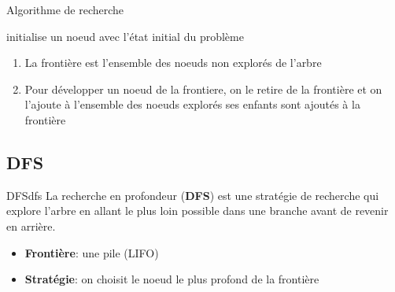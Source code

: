 \documentclass[a4paper, 12pt]{extarticle}
\begin{document}
\begin{algorithm}[H]
    \caption{Algorithme de recherche}\label{alg:stsearch}
    \begin{algorithmic}
        \State initialise un noeud avec l'état initial du problème

        \EndLoop
        \EndFunction
    \end{algorithmic}
\end{algorithm}

\begin{remarks}\leavevmode
\begin{enumerate}
    \item La frontière est l'ensemble des noeuds non explorés de l'arbre
    \item Pour développer un noeud de la frontiere, on le retire de la frontière et on l'ajoute à l'ensemble des noeuds explorés
        ses enfants sont ajoutés à la frontière
\end{enumerate}
\end{remarks}




\subsection{DFS} %
\label{sub:dfs}

\begin{definition}{DFS}{dfs}
    La recherche en profondeur (\textbf{DFS}) est une stratégie de recherche qui explore l'arbre en allant le plus loin possible dans une branche avant de revenir en arrière. 
    \begin{itemize}
        \item \textbf{Frontière}: une pile (LIFO)
        \item \textbf{Stratégie}: on choisit le noeud le plus profond de la frontière
    \end{itemize} 
\end{definition}
\end{document}
